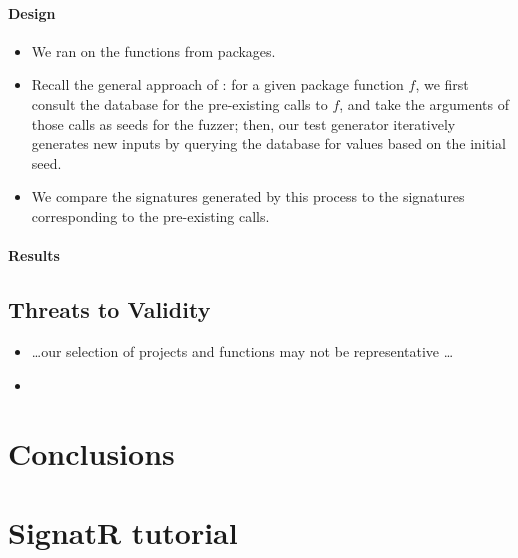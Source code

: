 \documentclass[sigplan,anonymous,review]{acmart}
\newcommand{\Name}{SignatR\xspace}
\begin{document}
\paragraph{Design}
\begin{itemize}
    \item We ran \tool on the   functions from  packages.
    \item Recall the general approach of \tool: for a given package function $f$, we first consult the database for the pre-existing calls to $f$, and take the arguments of those calls as seeds for the fuzzer; then, our test generator iteratively generates new inputs by querying the database for values based on the initial seed.
    \item We compare the signatures generated by this process to the signatures corresponding to the pre-existing calls.
\end{itemize}

\paragraph{Results}

\subsection{Threats to Validity}

\begin{itemize}
    \item \ldots our selection of projects and functions may not be representative \ldots
    \item {}
\end{itemize}

\section{Conclusions}
\label{sec:conclusions}




\appendix

\section{\Name tutorial}
\end{document}
